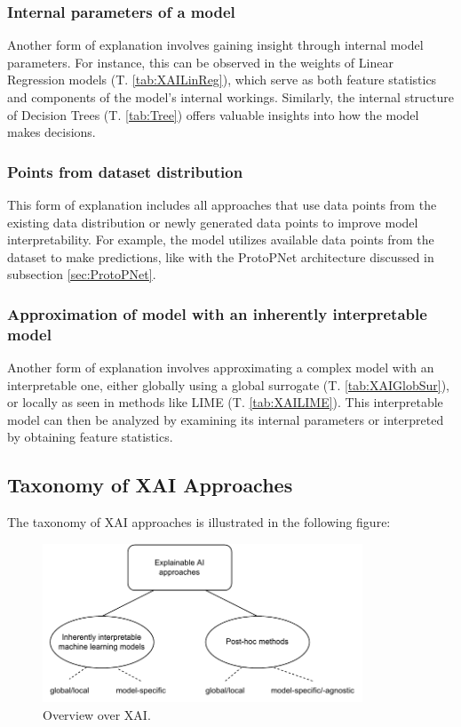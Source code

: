 \subsubsection*{Internal parameters of a model}
Another form of explanation involves gaining insight through internal model parameters. For instance, this can be observed in the weights of Linear Regression models (T. \ref{tab:XAILinReg}), which serve as both feature statistics and components of the model's internal workings. Similarly, the internal structure of Decision Trees (T. \ref{tab:Tree}) offers valuable insights into how the model makes decisions.

\subsubsection*{Points from dataset distribution}
This form of explanation includes all approaches that use data points from the existing data distribution or newly generated data points to improve model interpretability. For example, the model utilizes available data points from the dataset to make predictions, like with the ProtoPNet architecture discussed in subsection \ref{sec:ProtoPNet}.

\subsubsection*{Approximation of model with an inherently interpretable model}
Another form of explanation involves approximating a complex model with an interpretable one, either globally using a global surrogate (T. \ref{tab:XAIGlobSur}), or locally as seen in methods like LIME (T. \ref{tab:XAILIME}). This interpretable model can then be analyzed by examining its internal parameters or interpreted by obtaining feature statistics.

\subsection{Taxonomy of XAI Approaches}

The taxonomy of XAI approaches is illustrated in the following figure:
\begin{figure}[H]
    \centering
    \includegraphics[width=0.85\textwidth]{pics/XAI_Overview.pdf}
    \caption{Overview over XAI.}
    \label{fig:ov-xai}
\end{figure}

